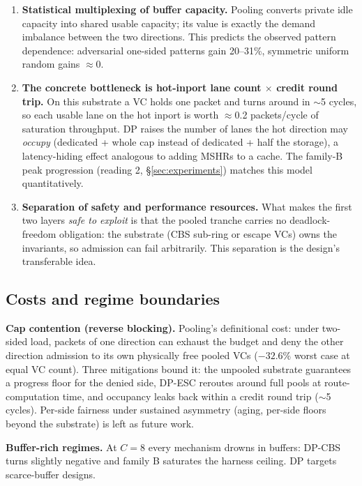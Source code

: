 \documentclass[10pt]{article}
\begin{document}
\begin{enumerate}
  \item \textbf{Statistical multiplexing of buffer capacity.} Pooling
    converts private idle capacity into shared usable capacity; its value
    is exactly the demand imbalance between the two directions. This
    predicts the observed pattern dependence: adversarial one-sided
    patterns gain 20--31\%, symmetric uniform random gains $\approx$0.
  \item \textbf{The concrete bottleneck is hot-inport lane count
    $\times$ credit round trip.} On this substrate a VC holds one packet
    and turns around in $\sim$5 cycles, so each usable lane on the hot
    inport is worth $\approx$0.2 packets/cycle of saturation throughput.
    DP raises the number of lanes the hot direction may \emph{occupy}
    (dedicated + whole cap instead of dedicated + half the storage), a
    latency-hiding effect analogous to adding MSHRs to a cache. The
    family-B peak progression (reading 2, \S\ref{sec:experiments})
    matches this model quantitatively.
  \item \textbf{Separation of safety and performance resources.} What
    makes the first two layers \emph{safe to exploit} is that the pooled
    tranche carries no deadlock-freedom obligation: the substrate (CBS
    sub-ring or escape VCs) owns the invariants, so admission can fail
    arbitrarily. This separation is the design's transferable idea.
\end{enumerate}

\subsection{Costs and regime boundaries}

\textbf{Cap contention (reverse blocking).} Pooling's definitional cost:
under two-sided load, packets of one direction can exhaust the budget and
deny the other direction admission to its own physically free pooled VCs
($-32.6\%$ worst case at equal VC count). Three mitigations bound it: the
unpooled substrate guarantees a progress floor for the denied side,
DP-ESC reroutes around full pools at route-computation time, and
occupancy leaks back within a credit round trip ($\sim$5 cycles).
Per-side fairness under sustained asymmetry (aging, per-side floors
beyond the substrate) is left as future work.

\textbf{Buffer-rich regimes.} At $C{=}8$ every mechanism drowns in
buffers: DP-CBS turns slightly negative and family B saturates the
harness ceiling. DP targets scarce-buffer designs.
\end{document}
